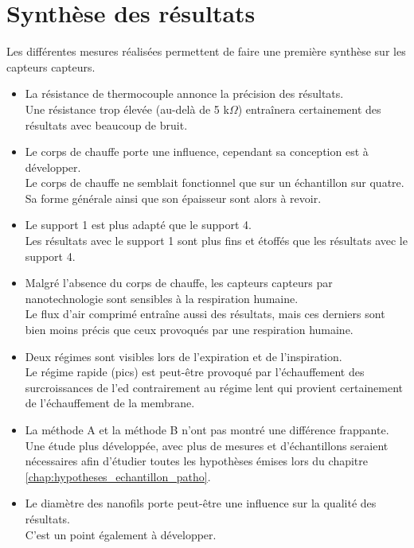 \section{Synthèse des résultats}
Les différentes mesures réalisées permettent de faire une première synthèse sur les capteurs \gls{capteur}s. 
\begin{itemize}
    \item La résistance de thermocouple annonce la précision des résultats. \\
          Une résistance trop élevée (au-delà de 5 k$\Omega$) entraînera certainement des résultats avec beaucoup de bruit. \\
          
    \item Le corps de chauffe porte une influence, cependant sa conception est à développer.\\
          Le corps de chauffe ne semblait fonctionnel que sur un échantillon sur quatre. Sa forme générale ainsi que son épaisseur sont alors à revoir. \\
          
    \item Le support 1 est plus adapté que le support 4. \\
          Les résultats avec le support 1 sont plus fins et étoffés que les résultats avec le support 4. \\
          
    \item Malgré l'absence du corps de chauffe, les capteurs \gls{capteur}s par nanotechnologie sont sensibles à la respiration humaine. \\
          Le flux d'air comprimé entraîne aussi des résultats, mais ces derniers sont bien moins précis que ceux provoqués par une respiration humaine. \\
          
    \item Deux régimes sont visibles lors de l'expiration et de l'inspiration.\\
          Le régime rapide (pics) est peut-être provoqué par l'échauffement des surcroissances de l'\gls{ed} contrairement au régime lent qui provient certainement de 
          l'échauffement de la membrane. \\
          
    \item La méthode A et la méthode B n'ont pas montré une différence frappante. \\
          Une étude plus développée, avec plus de mesures et d'échantillons seraient nécessaires afin d'étudier toutes les hypothèses émises lors du chapitre 
          \ref{chap:hypotheses_echantillon_patho}. \\
          
    \item Le diamètre des nanofils porte peut-être une influence sur la qualité des résultats.\\
          C'est un point également à développer. 
\end{itemize}

